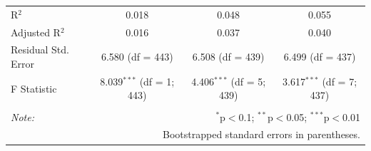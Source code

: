 \begin{table}[!htbp]
\begin{tabular}{@{\extracolsep{5pt}}lccc}
R$^{2}$ & 0.018 & 0.048 & 0.055 \\ 
Adjusted R$^{2}$ & 0.016 & 0.037 & 0.040 \\ 
Residual Std. Error & 6.580 (df = 443) & 6.508 (df = 439) & 6.499 (df = 437) \\ 
F Statistic & 8.039$^{***}$ (df = 1; 443) & 4.406$^{***}$ (df = 5; 439) & 3.617$^{***}$ (df = 7; 437) \\ 
\hline 
\hline \\[-1.8ex] 
\textit{Note:}  & \multicolumn{3}{r}{$^{*}$p$<$0.1; $^{**}$p$<$0.05; $^{***}$p$<$0.01} \\ 
 & \multicolumn{3}{r}{Bootstrapped standard errors in parentheses.} \\ 
\end{tabular} 
\end{table} 
